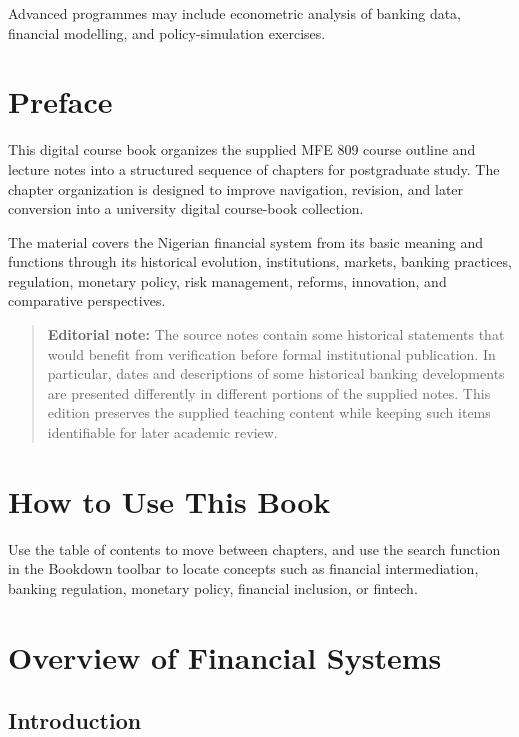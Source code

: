 \documentclass[
]{article}
\begin{document}
Advanced programmes may include econometric analysis of banking data, financial modelling, and policy-simulation exercises.

\section{Preface}\label{preface}

This digital course book organizes the supplied MFE 809 course outline and lecture notes into a structured sequence of chapters for postgraduate study. The chapter organization is designed to improve navigation, revision, and later conversion into a university digital course-book collection.

The material covers the Nigerian financial system from its basic meaning and functions through its historical evolution, institutions, markets, banking practices, regulation, monetary policy, risk management, reforms, innovation, and comparative perspectives.

\begin{quote}
\textbf{Editorial note:} The source notes contain some historical statements that would benefit from verification before formal institutional publication. In particular, dates and descriptions of some historical banking developments are presented differently in different portions of the supplied notes. This edition preserves the supplied teaching content while keeping such items identifiable for later academic review.
\end{quote}

\section{How to Use This Book}\label{how-to-use-this-book}

Use the table of contents to move between chapters, and use the search function in the Bookdown toolbar to locate concepts such as financial intermediation, banking regulation, monetary policy, financial inclusion, or fintech.

\section{Overview of Financial Systems}\label{overview-of-financial-systems}

\subsection{Introduction}\label{introduction}
\end{document}
